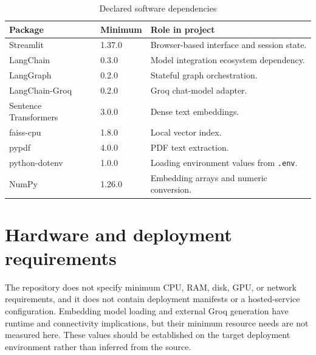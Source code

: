 \begin{table}[htbp]
\centering
\caption{Declared software dependencies}
\label{tab:dependencies}
\begin{tabularx}{\textwidth}{p{}p{}Y}
\toprule
\textbf{Package} & \textbf{Minimum} & \textbf{Role in project}\\
\midrule
Streamlit & 1.37.0 & Browser-based interface and session state.\\
LangChain & 0.3.0 & Model integration ecosystem dependency.\\
LangGraph & 0.2.0 & Stateful graph orchestration.\\
LangChain-Groq & 0.2.0 & Groq chat-model adapter.\\
Sentence Transformers & 3.0.0 & Dense text embeddings.\\
faiss-cpu & 1.8.0 & Local vector index.\\
pypdf & 4.0.0 & PDF text extraction.\\
python-dotenv & 1.0.0 & Loading environment values from \texttt{.env}.\\
NumPy & 1.26.0 & Embedding arrays and numeric conversion.\\
\bottomrule
\end{tabularx}
\end{table}

\section{Hardware and deployment requirements}
The repository does not specify minimum CPU, RAM, disk, GPU, or network requirements, and it does not contain deployment manifests or a hosted-service configuration. Embedding model loading and external Groq generation have runtime and connectivity implications, but their minimum resource needs are not measured here. These values should be established on the target deployment environment rather than inferred from the source.

